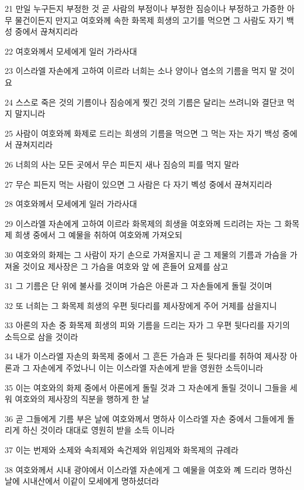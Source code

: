 \par 21 만일 누구든지 부정한 것 곧 사람의 부정이나 부정한 짐승이나 부정하고 가증한 아무 물건이든지 만지고 여호와께 속한 화목제 희생의 고기를 먹으면 그 사람도 자기 백성 중에서 끊쳐지리라
\par 22 여호와께서 모세에게 일러 가라사대
\par 23 이스라엘 자손에게 고하여 이르라 너희는 소나 양이나 염소의 기름을 먹지 말 것이요
\par 24 스스로 죽은 것의 기름이나 짐승에게 찢긴 것의 기름은 달리는 쓰려니와 결단코 먹지 말지니라
\par 25 사람이 여호와께 화제로 드리는 희생의 기름을 먹으면 그 먹는 자는 자기 백성 중에서 끊쳐지리라
\par 26 너희의 사는 모든 곳에서 무슨 피든지 새나 짐승의 피를 먹지 말라
\par 27 무슨 피든지 먹는 사람이 있으면 그 사람은 다 자기 벡성 중에서 끊쳐지리라
\par 28 여호와께서 모세에게 일러 가라사대
\par 29 이스라엘 자손에게 고하여 이르라 화목제의 희생을 여호와께 드리려는 자는 그 화목제 희생 중에서 그 예물을 취하여 여호와께 가져오되
\par 30 여호와의 화제는 그 사람이 자기 손으로 가져올지니 곧 그 제물의 기름과 가슴을 가져올 것이요 제사장은 그 가슴을 여호와 앞 에 흔들어 요제를 삼고
\par 31 그 기름은 단 위에 불사를 것이며 가슴은 아론과 그 자손들에게 돌릴 것이며
\par 32 또 너희는 그 화목제 희생의 우편 뒷다리를 제사장에게 주어 거제를 삼을지니
\par 33 아론의 자손 중 화목제 희생의 피와 기름을 드리는 자가 그 우편 뒷다리를 자기의 소득으로 삼을 것이라
\par 34 내가 이스라엘 자손의 화목제 중에서 그 흔든 가슴과 든 뒷다리를 취하여 제사장 아론과 그 자손에게 주었나니 이는 이스라엘 자손에게 받을 영원한 소득이니라
\par 35 이는 여호와의 화제 중에서 아론에게 돌릴 것과 그 자손에게 돌릴 것이니 그들을 세워 여호와의 제사장의 직분을 행하게 한 날
\par 36 곧 그들에게 기름 부은 날에 여호와께서 명하사 이스라엘 자손 중에서 그들에게 돌리게 하신 것이라 대대로 영원히 받을 소득 이니라
\par 37 이는 번제와 소제와 속죄제와 속건제와 위임제와 화목제의 규례라
\par 38 여호와께서 시내 광야에서 이스라엘 자손에게 그 예물을 여호와 꼐 드리라 명하신 날에 시내산에서 이같이 모세에게 명하셨더라

